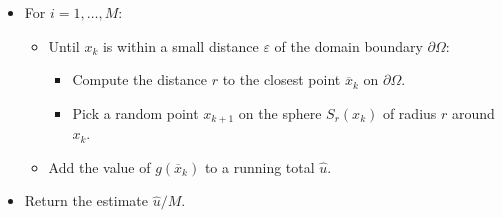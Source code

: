 \documentclass{article}
\renewcommand{\vec}[1]{#1}
\begin{document}
\begin{itemize}
   \item For \(i = 1, \ldots, M\):
\begin{itemize}
   \item Until \(\vec{x}_k\) is within a small distance \(\varepsilon\) of the domain boundary \(\partial\Omega\):
      \begin{itemize}
         \item Compute the distance \(r\) to the closest point \(\overline{\vec{x}}_k\) on \(\partial\Omega\).
         \item Pick a random point \(\vec{x}_{k+1}\) on the sphere \(S_r(\vec{x}_k)\) of radius \(r\) around \(\vec{x}_k\).
      \end{itemize}
   \item Add the value of \(g(\overline{\vec{x}}_k)\) to a running total \(\widehat{u}\).
\end{itemize}
   \item Return the estimate \(\widehat{u}/M\).
\end{itemize}
\end{document}
